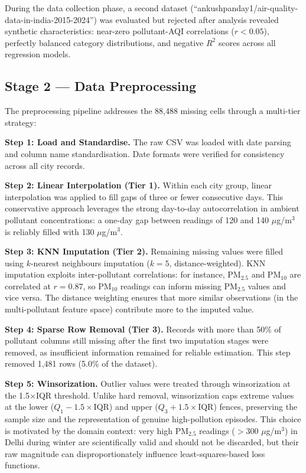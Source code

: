 \documentclass[12pt,a4paper]{report}
\begin{document}
During the data collection phase, a second dataset (``ankushpanday1/air-quality-data-in-india-2015-2024'') was evaluated but rejected after analysis revealed synthetic characteristics: near-zero pollutant-AQI correlations ($r < 0.05$), perfectly balanced category distributions, and negative $R^2$ scores across all regression models.

\subsection{Stage 2 --- Data Preprocessing}

The preprocessing pipeline addresses the 88,488 missing cells through a multi-tier strategy:

\textbf{Step 1: Load and Standardise.} The raw CSV was loaded with date parsing and column name standardisation. Date formats were verified for consistency across all city records.

\textbf{Step 2: Linear Interpolation (Tier 1).} Within each city group, linear interpolation was applied to fill gaps of three or fewer consecutive days. This conservative approach leverages the strong day-to-day autocorrelation in ambient pollutant concentrations: a one-day gap between readings of 120 and 140 $\mu$g/m$^3$ is reliably filled with 130 $\mu$g/m$^3$.

\textbf{Step 3: KNN Imputation (Tier 2).} Remaining missing values were filled using $k$-nearest neighbours imputation ($k = 5$, distance-weighted). KNN imputation exploits inter-pollutant correlations: for instance, PM$_{2.5}$ and PM$_{10}$ are correlated at $r = 0.87$, so PM$_{10}$ readings can inform missing PM$_{2.5}$ values and vice versa. The distance weighting ensures that more similar observations (in the multi-pollutant feature space) contribute more to the imputed value.

\textbf{Step 4: Sparse Row Removal (Tier 3).} Records with more than 50\% of pollutant columns still missing after the first two imputation stages were removed, as insufficient information remained for reliable estimation. This step removed 1,481 rows (5.0\% of the dataset).

\textbf{Step 5: Winsorization.} Outlier values were treated through winsorization at the 1.5$\times$IQR threshold. Unlike hard removal, winsorization caps extreme values at the lower ($Q_1 - 1.5 \times \text{IQR}$) and upper ($Q_3 + 1.5 \times \text{IQR}$) fences, preserving the sample size and the representation of genuine high-pollution episodes. This choice is motivated by the domain context: very high PM$_{2.5}$ readings ($>$300 $\mu$g/m$^3$) in Delhi during winter are scientifically valid and should not be discarded, but their raw magnitude can disproportionately influence least-squares-based loss functions.
\end{document}

